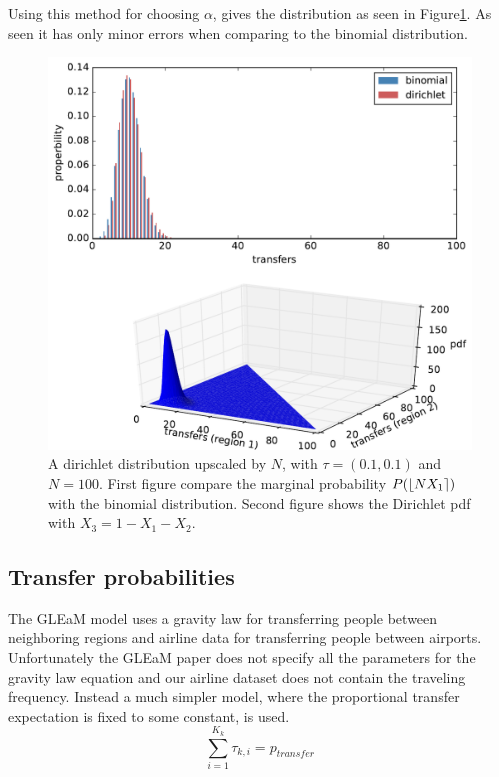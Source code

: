Using this method for choosing $\alpha$, gives the distribution as seen in Figure\ref{fig:dirichlet-validation}. As seen it has only minor errors when comparing to the binomial distribution.

\begin{figure}[H]
	\centering
	\includegraphics[width= 1.0 \linewidth]{plots/dirichlet-validation}
	\caption{A dirichlet distribution  upscaled by $N$, with $\tau = (0.1, 0.1)$ and $N = 100$. First figure compare the marginal probability $P(\iround*{N X_1})$ with the binomial distribution. Second figure shows the Dirichlet pdf with $X_3 = 1- X_1 - X_2$.}
	\label{fig:dirichlet-validation}
\end{figure}

\subsection{Transfer probabilities}

The GLEaM model \cite{GLEaM} uses a gravity law for transferring people between neighboring regions and airline data for transferring people between airports. Unfortunately the GLEaM paper does not specify all the parameters for the gravity law equation and our airline dataset does not contain the traveling frequency. Instead a much simpler model, where the proportional transfer expectation is fixed to some constant, is used.
\begin{equation}
\sum_{i = 1}^{K_k} \tau_{k, i} = p_{transfer}
\end{equation}

